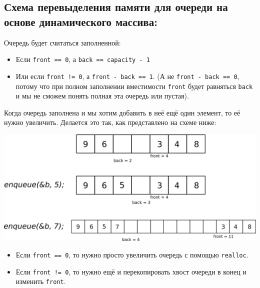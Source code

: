 \documentclass[10pt]{article}
\begin{document}
\subsection*{Схема перевыделения памяти для очереди на основе динамического массива:}
Очередь будет считаться заполненной: 
\begin{itemize}
\item Если \texttt{front == 0}, а \texttt{back == capacity - 1}
\item Или если \texttt{front != 0}, а \texttt{front - back == 1}. (А не \texttt{front - back == 0}, потому что при полном заполнении вместимости \texttt{front} будет равняться \texttt{back} и мы не сможем понять полная эта очередь или пустая).
\end{itemize}
 Когда очередь заполнена и мы хотим добавить в неё ещё один элемент, то её нужно увеличить. Делается это так, как представлено на схеме ниже:
\begin{center}
\includegraphics[scale=0.8]{../images/queue_dynamic.png}
\end{center}

\begin{itemize}
\item Если \texttt{front == 0}, то нужно просто увеличить очередь с помощью \texttt{realloc}.
\item Если \texttt{front != 0}, то нужно ещё и перекопировать хвост очереди в конец и изменить \texttt{front}.
\end{itemize}
\end{document}
